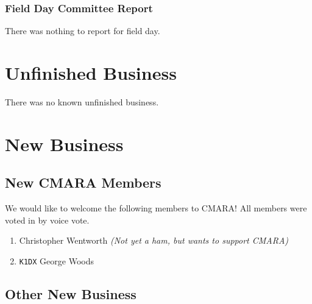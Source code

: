 \documentclass[10pt,letterpaper]{article}
\begin{document}
\subsubsection{Field Day Committee Report}
There was nothing to report for field day.

\section{Unfinished Business}
There was no known unfinished business.

\section{New Business}

\subsection{New CMARA Members}
\label{new-cmara-members}
We would like to welcome the following members to CMARA! All members were voted in by voice vote.
\begin{enumerate}
  \item Christopher Wentworth \emph{(Not yet a ham, but wants to support CMARA)}
  \item \texttt{K1DX} George Woods
\end{enumerate}

\subsection{Other New Business}
\end{document}
